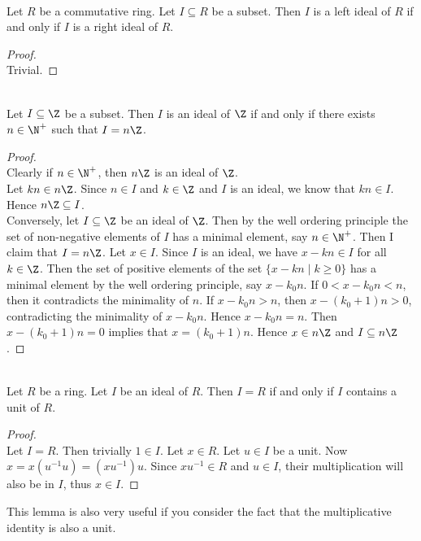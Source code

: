 \documentclass[a4paper]{article}
\begin{document}
\begin{lmm}{}{}\\
Let $R$ be a commutative ring. Let $I\subseteq R$ be a subset. Then $I$ is a left ideal of $R$ if and only if $I$ is a right ideal of $R$. 
\begin{proof}\\
Trivial. 
\end{proof}
\end{lmm}

\begin{eg}{}{}\\
Let $I\subseteq\Z$ be a subset. Then $I$ is an ideal of $\Z$ if and only if there exists $n\in\N^+$ such that $I=n\Z$. 
\begin{proof}\\
Clearly if $n\in\N^+$, then $n\Z$ is an ideal of $\Z$. \\

Let $kn\in n\Z$. Since $n\in I$ and $k\in\Z$ and $I$ is an ideal, we know that $kn\in I$. Hence $n\Z\subseteq I$. \\

Conversely, let $I\subseteq\Z$ be an ideal of $\Z$. Then by the well ordering principle the set of non-negative elements of $I$ has a minimal element, say $n\in\N^+$. Then I claim that $I=n\Z$. Let $x\in I$. Since $I$ is an ideal, we have $x-kn\in I$ for all $k\in\Z$. Then the set of positive elements of the set $\{x-kn\;|\;k\geq 0\}$ has a minimal element by the well ordering principle, say $x-k_0n$. If $0<x-k_0n<n$, then it contradicts the minimality of $n$. If $x-k_0n>n$, then $x-(k_0+1)n>0$, contradicting the minimality of $x-k_0n$. Hence $x-k_0n=n$. Then $x-(k_0+1)n=0$ implies that $x=(k_0+1)n$. Hence $x\in n\Z$ and $I\subseteq n\Z$. 
\end{proof}
\end{eg}

\begin{lmm}{}{}\\
Let $R$ be a ring. Let $I$ be an ideal of $R$. Then $I=R$ if and only if $I$ contains a unit of $R$. 
\begin{proof}\\
Let $I=R$. Then trivially $1\in I$. Let $x\in R$. Let $u\in I$ be a unit. Now $x=x(u^{-1}u)=(xu^{-1})u$. Since $xu^{-1}\in R$ and $u\in I$, their multiplication will also be in $I$, thus $x\in I$. 
\end{proof}
\end{lmm}

This lemma is also very useful if you consider the fact that the multiplicative identity is also a unit. 
\end{document}
